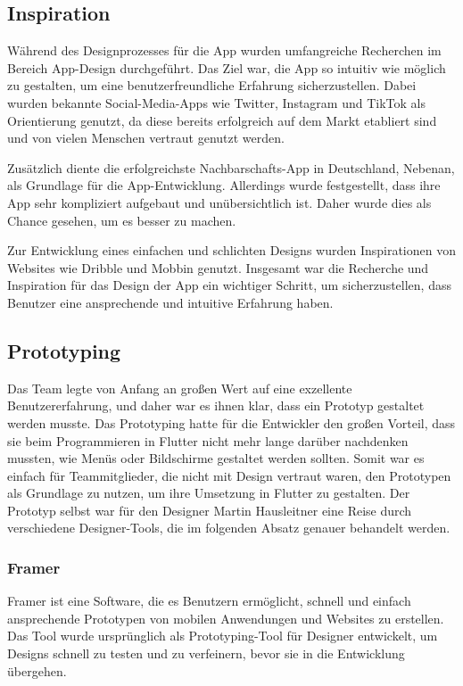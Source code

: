 \subsection{Inspiration}
Während des Designprozesses für die App wurden umfangreiche Recherchen im Bereich App-Design durchgeführt. Das Ziel war, die App so intuitiv wie möglich zu gestalten, um eine benutzerfreundliche Erfahrung sicherzustellen. Dabei wurden bekannte Social-Media-Apps wie Twitter\cite{twitter}, Instagram\cite{instagram} und TikTok\cite{tiktok} als Orientierung genutzt, da diese bereits erfolgreich auf dem Markt etabliert sind und von vielen Menschen vertraut genutzt werden.

Zusätzlich diente die erfolgreichste Nachbarschafts-App in Deutschland, Nebenan\cite{nebenan}, als Grundlage für die App-Entwicklung. Allerdings wurde festgestellt, dass ihre App sehr kompliziert aufgebaut und unübersichtlich ist. Daher wurde dies als Chance gesehen, um es besser zu machen.

Zur Entwicklung eines einfachen und schlichten Designs wurden Inspirationen von Websites wie Dribble\cite{dribble} und Mobbin\cite{mobbin} genutzt. Insgesamt war die Recherche und Inspiration für das Design der App ein wichtiger Schritt, um sicherzustellen, dass Benutzer eine ansprechende und intuitive Erfahrung haben.

\subsection{Prototyping}
Das Team legte von Anfang an großen Wert auf eine exzellente
Benutzererfahrung, und daher war es ihnen klar, dass ein
Prototyp gestaltet werden musste. Das Prototyping hatte für
die Entwickler den großen Vorteil, dass sie beim
Programmieren in Flutter nicht mehr lange darüber nachdenken
mussten, wie Menüs oder Bildschirme gestaltet werden
sollten. Somit war es einfach für Teammitglieder, die nicht
mit Design vertraut waren, den Prototypen als Grundlage zu
nutzen, um ihre Umsetzung in Flutter zu gestalten. Der
Prototyp selbst war für den Designer Martin Hausleitner eine
Reise durch verschiedene Designer-Tools, die im folgenden
Absatz genauer behandelt werden.


\subsubsection{Framer}

Framer ist eine Software, die es Benutzern ermöglicht, schnell und einfach ansprechende Prototypen von mobilen Anwendungen und Websites zu erstellen. Das Tool wurde ursprünglich als Prototyping-Tool für Designer entwickelt, um Designs schnell zu testen und zu verfeinern, bevor sie in die Entwicklung übergehen.

